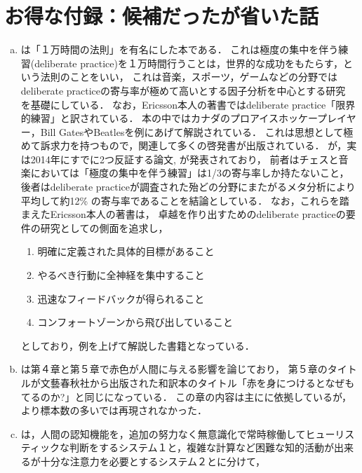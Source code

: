 \documentclass[uplatex, dvipdfmx]{jsarticle}
\begin{document}
\section*{お得な付録：候補だったが省いた話}

\begin{enumerate}[(a)]
    \item \cite{MalcolmGladwell08-Outliers}は「１万時間の法則」を有名にした本である．
    これは極度の集中を伴う練習(deliberate practice)を１万時間行うことは，世界的な成功をもたらす，という法則のことをいい，
    これは音楽，スポーツ，ゲームなどの分野ではdeliberate practiceの寄与率が極めて高いとする因子分析を中心とする研究
    \cite{EricssonEA93-GRIT}を基礎にしている．
    なお，Ericsson本人の著書\cite{Ericsson16-PEAK}ではdeliberate practice「限界的練習」と訳されている．
    本の中ではカナダのプロアイスホッケープレイヤー，Bill GatesやBeatlesを例にあげて解説されている．
    これは思想として極めて訴求力を持つもので，関連して多くの啓発書が出版されている\cite{CalNewport16}．
    が，実は2014年にすでに2つ反証する論文\cite{Hambrick14-AntiGRIT}, \cite{Brooke14-AntiGRIT}が発表されており，
    前者はチェスと音楽においては「極度の集中を伴う練習」は1/3の寄与率しか持たないこと，
    後者はdeliberate practiceが調査された殆どの分野にまたがるメタ分析により平均して約12\% の寄与率であることを結論としている．
    なお，これらを踏まえたEricsson本人の著書\cite{Ericsson16-PEAK}は，
    卓越を作り出すためのdeliberate practiceの要件の研究としての側面を追求し，
    \begin{enumerate}[(1)]
        \item 明確に定義された具体的目標があること
        \item やるべき行動に全神経を集中すること
        \item 迅速なフィードバックが得られること
        \item コンフォートゾーンから飛び出していること
    \end{enumerate}
    としており，例を上げて解説した書籍となっている．
    \item \cite{ThalmaLobel16-Sensation}は第４章と第５章で赤色が人間に与える影響を論じており，
    第５章のタイトルが文藝春秋社から出版された和訳本のタイトル「赤を身につけるとなぜもてるのか?」と同じになっている．
    この章の内容は主に\cite{Pazda12-SexyRed}に依拠しているが，より標本数の多い\cite{16-AntiSexiRed}では再現されなかった．
    \item \cite{DanielKahneman13-FastAndSlow}は，人間の認知機能を，追加の努力なく無意識化で常時稼働してヒューリスティックな判断をするシステム１と，複雑な計算など困難な知的活動が出来るが十分な注意力を必要とするシステム２とに分けて，

\end{enumerate}
\end{document}
